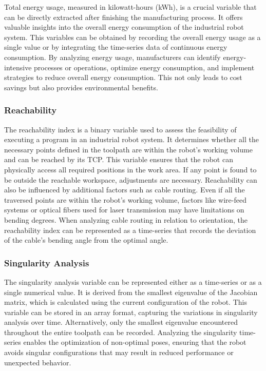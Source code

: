Total energy usage, measured in kilowatt-hours (kWh), is a crucial variable that can be directly extracted after finishing the manufacturing process. It offers valuable insights into the overall energy consumption of the industrial robot system. This variables can be obtained by recording the overall energy usage as a single value or by integrating the time-series data of continuous energy consumption. By analyzing energy usage, manufacturers can identify energy-intensive processes or operations, optimize energy consumption, and implement strategies to reduce overall energy consumption. This not only leads to cost savings but also provides environmental benefits.



\subsubsection*{Reachability}
The reachability index is a binary variable used to assess the feasibility of executing a program in an industrial robot system. It determines whether all the necessary points defined in the toolpath are within the robot's working volume and can be reached by its \acrshort{TCP}. This variable ensures that the robot can physically access all required positions in the work area. If any point is found to be outside the reachable workspace, adjustments are necessary. Reachability can also be influenced by additional factors such as cable routing. Even if all the traversed points are within the robot's working volume, factors like wire-feed systems or optical fibers used for laser transmission may have limitations on bending degrees. When analyzing cable routing in relation to orientation, the reachability index can be represented as a time-series that records the deviation of the cable's bending angle from the optimal angle.

\subsubsection*{Singularity Analysis}
The singularity analysis variable can be represented either as a time-series or as a single numerical value. It is derived from the smallest eigenvalue of the Jacobian matrix, which is calculated using the current configuration of the robot. This variable can be stored in an array format, capturing the variations in singularity analysis over time. Alternatively, only the smallest eigenvalue encountered throughout the entire toolpath can be recorded. Analyzing the singularity time-series enables the optimization of non-optimal poses, ensuring that the robot avoids singular configurations that may result in reduced performance or unexpected behavior.

